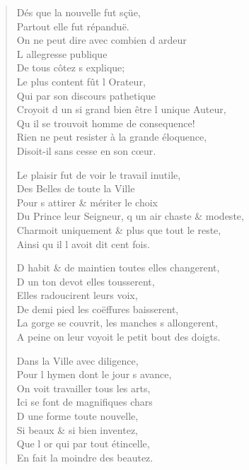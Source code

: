 \begin{verse}
\vin Dés que la nouvelle fut sçüe, \\
\vin Partout elle fut répanduë. \\
\vin On ne peut dire avec combien d\textquotesingle{} ardeur \\
\vin L\textquotesingle{} allegresse publique \\
\vin De tous côtez s\textquotesingle{} explique; \\
\vin Le plus content fût l\textquotesingle{} Orateur, \\
\vin Qui par son discours pathetique \\
Croyoit d\textquotesingle{} un si grand bien être l\textquotesingle{} unique Auteur, \\
\vin Qu\textquotesingle{} il se trouvoit homme de consequence! \\
Rien ne peut resister à la grande éloquence, \\
\vin Disoit-il sans cesse en son cœur.

Le plaisir fut de voir le travail inutile, \\
\vin Des Belles de toute la Ville \\
\vin Pour s\textquotesingle{} attirer \& mériter le choix \\
Du Prince leur Seigneur, q\textquotesingle{} un air chaste \& modeste, \\
Charmoit uniquement \& plus que tout le reste, \\
\vin Ainsi qu\textquotesingle{} il l\textquotesingle{} avoit dit cent fois.

D\textquotesingle{} habit \& de maintien toutes elles changerent, \\
\vin D\textquotesingle{} un ton devot elles tousserent, \\
\vin Elles radoucirent leurs voix, \\
\vin De demi pied les coëffures baisserent, \\
La gorge se couvrit, les manches s\textquotesingle{} allongerent, \\
A peine on leur voyoit le petit bout des doigts.

\vin Dans la Ville avec diligence, \\
\vin Pour l\textquotesingle{} hymen dont le jour s\textquotesingle{} avance, \\
\vin On voit travailler tous les arts, \\
\vin Ici se font de magnifiques chars \\
\vin D\textquotesingle{} une forme toute nouvelle, \\
\vin Si beaux \& si bien inventez, \\
\vin Que l\textquotesingle{} or qui par tout étincelle, \\
\vin En fait la moindre des beautez.


\end{verse}

